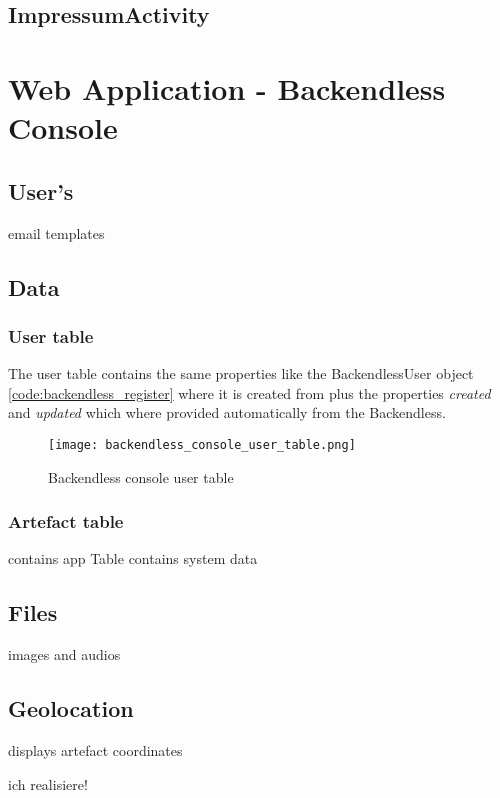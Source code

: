\subsection{ImpressumActivity}


\section{Web Application - Backendless Console}

\subsection{User's}
email templates
\subsection{Data}
\subsubsection{User table}
The user table contains the same properties like the BackendlessUser object \ref{code:backendless_register} where it is created from plus the properties \textit{created} and \textit{updated} which where provided automatically from the Backendless.

\begin{figure}[H]
	\centering \texttt{[image: backendless\_console\_user\_table.png]}
	\caption[backendlessConsoleUserTable]{Backendless console user table}
	\label{fig:backendlessConsoleUserTable}
\end{figure}

\subsubsection{Artefact table}
contains app Table
contains system data
\subsection{Files}
images and audios
\subsection{Geolocation}
displays artefact coordinates

ich realisiere!